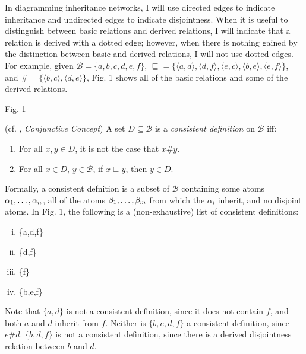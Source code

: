 \documentclass[12pt]{amsart}
\begin{document}
In diagramming inheritance networks, I will use directed edges to indicate inheritance and undirected edges to indicate disjointness. When it is useful to distinguish between basic relations and derived relations, I will indicate that a relation is derived with a dotted edge; however, when there is nothing gained by the distinction between basic and derived relations, I will not use dotted edges. For example, given $\mathcal{B}=\{a,b,c,d,e,f\}$, $\sqsubseteq=\{\langle a,d\rangle,\langle d,f\rangle,\langle e,c \rangle, \langle b,e\rangle,\langle e,f\rangle\}$, and $\#=\{\langle b,c\rangle,\langle d,e\rangle\}$, Fig. 1 shows all of the basic relations and some of the derived relations.
\par\vspace{5mm}
\centerline{
}
\centerline{Fig. 1}

\par\vspace{5mm}
(cf. \cite{carpenter_inclusion_1991}, \emph{Conjunctive Concept}) A set $D\subseteq\mathcal{B}$ is a \emph{consistent definition} on $\mathcal{B}$ iff:
\begin{enumerate}
\item For all $x,y\in D$, it is not the case that $x\#y$.
\item For all $x\in D$, $y\in\mathcal{B}$, if $x\sqsubseteq y$, then $y\in D$.
\end{enumerate}

Formally, a consistent defnition is a subset of $\mathcal{B}$ containing some atoms $\alpha_1,\mathellipsis,\alpha_n$, all of the atoms $\beta_1,\mathellipsis,\beta_m$ from which the $\alpha_i$ inherit, and no disjoint atoms. In Fig. 1, the following is a (non-exhaustive) list of consistent definitions:
\begin{enumerate}[(i)]
\item\{a,d,f\}
\item \{d,f\}
\item\{f\}
\item \{b,e,f\}
\end{enumerate}
Note that $\{a,d\}$ is not a consistent definition, since it does not contain $f$, and both $a$ and $d$ inherit from $f$. Neither is $\{b,e,d,f\}$ a consistent definition, since $e\# d$. $\{b,d,f\}$ is not a consistent definition, since there is a derived disjointness relation between $b$ and $d$.
\end{document}
